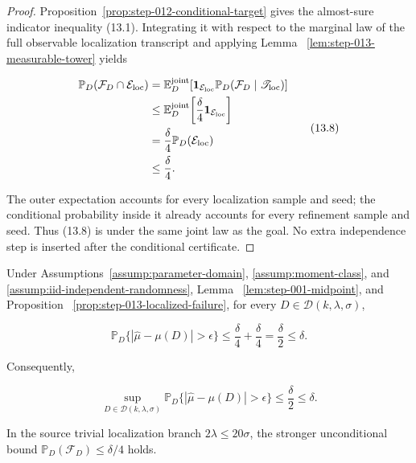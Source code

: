 \begin{proof}
Proposition~\ref{prop:step-012-conditional-target} gives the almost-sure
indicator inequality (13.1). Integrating it with respect to the marginal law
of the full observable localization transcript and applying Lemma~
\ref{lem:step-013-measurable-tower} yields

\[
\begin{aligned}
\mathbb P_D(\mathcal F_D\cap\mathcal E_{\rm loc})
&=\mathbb E_D^{\rm joint}\!\left[
 \mathbf1_{\mathcal E_{\rm loc}}
 \mathbb P_D(\mathcal F_D\mid\mathscr T_{\rm loc})
 \right]\\
&\leq\mathbb E_D^{\rm joint}\!\left[
 \frac\delta4\mathbf1_{\mathcal E_{\rm loc}}
 \right]\\
&=\frac\delta4\mathbb P_D(\mathcal E_{\rm loc})\\
&\leq\frac\delta4.
\end{aligned}
\tag{13.8}
\]

The outer expectation accounts for every localization sample and seed; the
conditional probability inside it already accounts for every refinement
sample and seed. Thus (13.8) is under the same joint law as the goal. No
extra independence step is inserted after the conditional
certificate.
\end{proof}

\begin{proposition}\label{prop:step-013-unconditional-pac}
Under Assumptions~\ref{assump:parameter-domain},
\ref{assump:moment-class}, and
\ref{assump:iid-independent-randomness}, Lemma~
\ref{lem:step-001-midpoint}, and Proposition~
\ref{prop:step-013-localized-failure}, for every
\(D\in\mathcal D(k,\lambda,\sigma)\),

\[
\boxed{
\mathbb P_D\{|\widehat\mu-\mu(D)|>\epsilon\}
\leq\frac\delta4+\frac\delta4
=\frac\delta2
\leq\delta.
}
\tag{13.9}
\]

Consequently,

\[
\sup_{D\in\mathcal D(k,\lambda,\sigma)}
\mathbb P_D\{|\widehat\mu-\mu(D)|>\epsilon\}
\leq\frac\delta2\leq\delta.
\tag{13.10}
\]

In the source trivial localization branch \(2\lambda\leq20\sigma\), the
stronger unconditional bound \(\mathbb P_D(\mathcal F_D)\leq\delta/4\)
holds.
\end{proposition}

